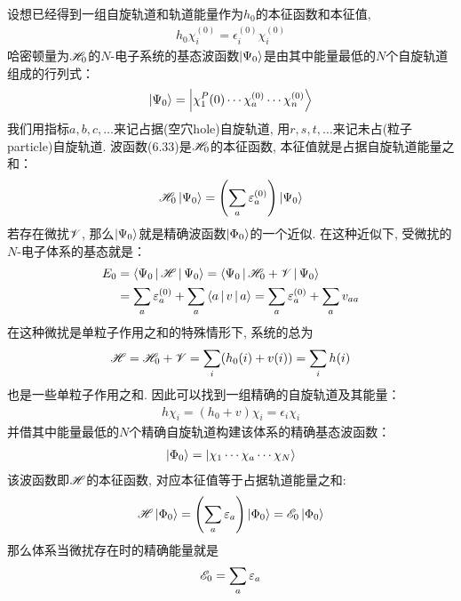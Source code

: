 设想已经得到一组自旋轨道和轨道能量作为$h_0$的本征函数和本征值,
\begin{align}
h_0\chi_i^{(0)} = \epsilon_i^{(0)} \chi_i^{(0)}
\end{align}
哈密顿量为$\mathscr{H}_0$的$N$-电子系统的基态波函数$\Ket{\Psi_0}$是由其中能量最低的$N$个自旋轨道组成的行列式：
\begin{align}
\Ket{\Psi_0} = \Ket{\chi_1^P(0)\cdots\chi_a^{(0)}\cdots\chi_n^{(0)}}
\end{align}
我们用指标$a,b,c,\ldots$来记占据(空穴hole)自旋轨道, 用$r,s,t,\ldots$来记未占(粒子particle)自旋轨道. 波函数(6.33)是$\mathscr{H}_0$的本征函数, 本征值就是占据自旋轨道能量之和：
\begin{align*}
\mathscr{H}_0\Ket{\Psi_0} = \left( \sum_a\varepsilon_a^{(0)} \right)\Ket{\Psi_0}
\end{align*}
若存在微扰$\mathscr{V}$, 那么$\Ket{\Psi_0}$就是精确波函数$\Ket{\Phi_0}$的一个近似. 在这种近似下, 受微扰的$N$-电子体系的基态就是：
\begin{align}
E_0 & = \Braket{\Psi_0|\mathscr{H}|\Psi_0} = \Braket{\Psi_0|\mathscr{H}_0+\mathscr{V}|\Psi_0}\notag\\
    & = \sum_a\varepsilon_a^{(0)} + \sum_a\Braket{a|v|a} = \sum_a\varepsilon_a^{(0)} + \sum_av_{aa}
\end{align}
在这种微扰是单粒子作用之和的特殊情形下, 系统的总\ha 为
\begin{align}
\mathscr{H} = \mathscr{H}_0 + \mathscr{V} = \sum_i(h_0(i)+v(i)) = \sum_ih(i) 
\end{align}
也是一些单粒子作用之和. 因此可以找到一组精确的自旋轨道及其能量：
\begin{align}
h\chi_i = (h_0+v)\chi_i = \epsilon_i\chi_i
\end{align}
并借其中能量最低的$N$个精确自旋轨道构建该体系的精确基态波函数：
\begin{align}
\Ket{\Phi_0} = \Ket{\chi_1\cdots\chi_a\cdots\chi_N}
\end{align}
该波函数即$\mathscr{H}$的本征函数, 对应本征值等于占据轨道能量之和:
\begin{align*}
\mathscr{H}\Ket{\Phi_0} = \left(\sum_a\varepsilon_a \right)\Ket{\Phi_0} = \mathscr{E}_0\Ket{\Phi_0}
\end{align*}
那么体系当微扰存在时的精确能量就是
\begin{align}
\mathscr{E}_0 = \sum_a\varepsilon_a
\end{align}

